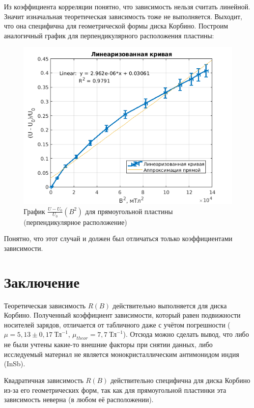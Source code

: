 Из коэффициента корреляции понятно, что зависимость нельзя считать линейной. Значит изначальная теоретическая зависимость тоже не выполняется. Выходит, что она специфична для геометрической формы диска Корбино. Построим аналогичный график для перпендикулярного расположения пластины:

\begin{figure}[h!]
    \centering
    \includegraphics[width = 11 cm]{images/UIMP1.png}
    \caption{График $\frac{U - U_0}{U_0}(B^2)$ для прямоугольной пластины (перпендикулярное расположение)}
    \label{uimp2}
\end{figure}

Понятно, что этот случай и должен был отличаться только коэффициентами зависимости. 

\section{Заключение}

Теоретическая зависимость $R(B)$ действительно выполняется для диска Корбино. Полученный коэффициент зависимости, который равен подвижности носителей зарядов, отличается от табличного даже с учётом погрешности ($\mu = 5,13 \pm 0,17 \; \text{Тл}^{-1}$, $\mu_{theor} = 7,7 \; \text{Тл}^{-1}$). Отсюда можно сделать вывод, что либо не были учтены какие-то внешние факторы при снятии данных, либо исследуемый материал не является монокристаллическим антимонидом индия (InSb).

Квадратичная зависимость $R(B)$ действительно специфична для диска Корбино из-за его геометрических форм, так как для прямоугольной пластинки эта зависимость неверна (в любом её расположении).






